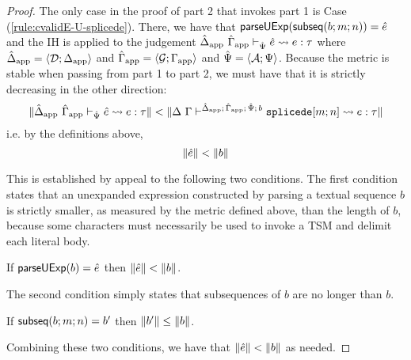 \begin{proof}
The only case in the proof of part 2 that invokes part 1 is Case (\ref{rule:cvalidE-U-splicede}). There, we have that $\mathsf{parseUExp}(\mathsf{subseq}(b; m; n))={\hat e}$ and the IH is applied to the judgement $\hat{\Delta}_\text{app}~\hat{\Gamma}_\text{app} \vdash_{\hat{\Psi}} {\hat e} \leadsto e : \tau$ where $\hat{\Delta}_\text{app}=\langle \mathcal{D}; \Delta_\text{app} \rangle$ and $\hat{\Gamma}_\text{app}=\langle \mathcal{G}; \Gamma_\text{app} \rangle$ and $\hat{\Psi}=\langle \mathcal{A}; \Psi \rangle$. Because the metric is stable when passing from part 1 to part 2, we must have that it is strictly decreasing in the other direction:
\[\Vert \hat{\Delta}_\text{app}~\hat{\Gamma}_\text{app} \vdash_{\hat{\Psi}} {\hat e} \leadsto e : \tau \Vert < \Vert \Delta~\Gamma\vdash^{\hat{\Delta}_\text{app};\,\hat{\Gamma}_\text{app};\,\hat{\Psi};\,b} \texttt{splicede}[m; n] \leadsto e : \tau \Vert\]
i.e. by the definitions above, 
\[\Vert {\hat e} \Vert < \Vert b \Vert\]

This is established by appeal to the following two conditions. The first condition states that an unexpanded expression constructed by parsing a textual sequence $b$ is strictly smaller, as measured by the metric defined above, than the length of $b$, because some characters must necessarily be used to invoke a TSM and delimit each literal body.
\begingroup
\def\thetheorem{\ref{condition:body-parsing}}
\begin{condition} If $\mathsf{parseUExp}(b)={\hat e}$ then $\Vert {\hat e} \Vert < \Vert b \Vert$.\end{condition}
\endgroup
The second condition simply states that subsequences of $b$ are no longer than $b$.
\begingroup
\def\thetheorem{\ref{condition:body-subsequences}}
\begin{condition} If $\mathsf{subseq}(b; m; n)=b'$ then $\Vert b' \Vert \leq \Vert b \Vert$. \end{condition}
\endgroup

Combining these two conditions, we have that $\Vert {\hat e} \Vert < \Vert b \Vert$ as needed.
\end{proof}

